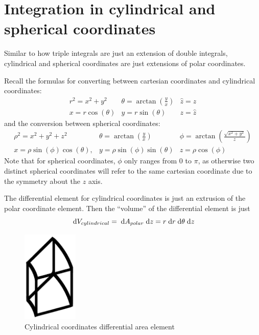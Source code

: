 \documentclass[letterpaper,11pt]{article}
\begin{document}
\section*{Integration in cylindrical and spherical coordinates}
Similar to how triple integrals are just an extension of double integrals,
cylindrical and spherical coordinates are just extensions of polar coordinates.

Recall the formulas for converting between cartesian coordinates and cylindrical coordinates:
$$
\begin{array}{ccc}
  r^2 = x^2 + y^2     & \theta = \arctan \left( \frac{y}{x} \right) & \hat{z} = z\\
  x = r \cos(\theta) & y = r \sin(\theta)                           & z = \hat{z}
\end{array}
$$
and the conversion between spherical coordinates:
$$
\begin{array}{ccc}
  \rho^2 = x^2 + y^2 + z^2 & \theta = \arctan \left( \frac{y}{x} \right) & \phi = \arctan \left( \frac{\sqrt{x^2 + y^2}}{z} \right)\\
  x = \rho \sin(\phi) \cos(\theta), & y = \rho \sin(\phi) \sin(\theta) & z = \rho \cos(\phi)
\end{array}
$$
Note that for spherical coordinates, $\phi$ only ranges from $0$ to $\pi$,
as otherwise two distinct spherical coordinates will refer to the same cartesian coordinate due to the symmetry about the $z$ axis.

The differential element for cylindrical coordinates is just an extrusion of the polar coordinate element.
Then the ``volume'' of the differential element is just
$$\;\mathrm{d}V_{cylindrical} = \;\mathrm{d}A_{polar} \;\mathrm{d}z = r \;\mathrm{d}r \;\mathrm{d}\theta \;\mathrm{d}z$$
\begin{figure}[h]
  \centering \includegraphics[width=100px]{mech222/worksheet_2b_cylinder_diff_elem.png}
  \caption{Cylindrical coordinates differential area element}
\end{figure}
\end{document}

